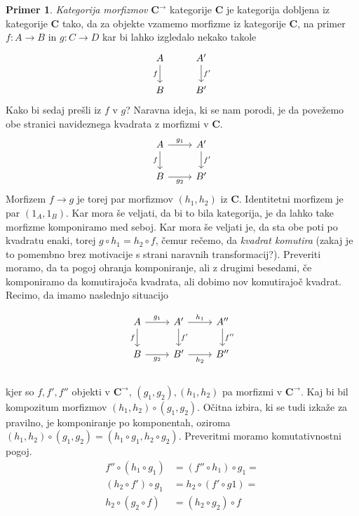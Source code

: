 \documentclass[12pt,a4paper]{book}
\theoremstyle{definition}
\theoremstyle{plain}
\theoremstyle{definition}
\newtheorem{primer}{Primer}[section]
\theoremstyle{remark}
\newcommand{\cat}[1]{\textbf{#1}}
\begin{document}
\begin{primer}
\textit{Kategorija morfizmov} $\cat{C}^{\rightarrow}$ kategorije $\cat{C}$ je kategorija dobljena iz kategorije $\cat{C}$ tako, da za objekte vzamemo morfizme iz kategorije $\cat{C}$, na primer $f : A \to B$ in $g : C \to D$ kar bi lahko izgledalo nekako takole
\[ \begin{tikzcd}
A \arrow[d, "f"'] & A' \arrow[d, "f'"] \\
B & B'
\end{tikzcd} \]
Kako bi sedaj prešli iz $f$ v $g$? Naravna ideja, ki se nam porodi, je da povežemo obe stranici navideznega kvadrata z morfizmi v $\cat{C}$.
\[ \begin{tikzcd}
A \arrow[d, "f"'] \arrow[r, "g_1"] & A' \arrow[d, "f'"] \\
B \arrow[r, "g_2"'] & B'
\end{tikzcd} \]
Morfizem $f \to g$ je torej par morfizmov $(h_1, h_2)$ iz $\cat{C}$.
Identitetni morfizem je par $(1_A, 1_B)$.
Kar mora še veljati, da bi to bila kategorija, je da lahko take morfizme komponiramo med seboj. Kar mora še veljati je, da sta obe poti po kvadratu enaki, torej $g \circ h_1 = h_2 \circ f$, čemur rečemo, da \textit{kvadrat komutira} (zakaj je to pomembno brez motivacije s strani naravnih transformacij?). Preveriti moramo, da ta pogoj ohranja komponiranje, ali z drugimi besedami, če komponiramo da komutirajoča kvadrata, ali dobimo nov komutirajoč kvadrat.
Recimo, da imamo naslednjo situacijo

\[ \begin{tikzcd}
A \arrow[d, "f"'] \arrow[r, "g_1"] & A' \arrow[d, "f'"] \arrow[r, "h_1"] & A'' \arrow[d, "f''"] \\
B \arrow[r, "g_2"'] & B' \arrow[r, "h_2"'] & B'' \\
\end{tikzcd} \]
kjer so $f, f', f''$ objekti v $\cat{C}^{\rightarrow}$, $(g_1, g_2), (h_1,h_2)$ pa morfizmi v $\cat{C}^{\rightarrow}$. Kaj bi bil kompozitum morfizmov $(h_1,h_2) \circ (g_1,g_2)$. Očitna izbira, ki se tudi izkaže za pravilno, je komponiranje po komponentah, oziroma $(h_1,h_2) \circ (g_1,g_2) = (h_1 \circ g_1, h_2 \circ g_2)$. Preveritmi moramo komutativnostni pogoj. 
\begin{align*}
f'' \circ (h_1 \circ g_1) &= (f'' \circ h_1) \circ g_1 = \\
(h_2 \circ f') \circ g_1 &= h_2 \circ (f' \circ g1) = \\
h_2 \circ (g_2 \circ f) &= (h_2 \circ g_2) \circ f
\end{align*}

\end{primer}
\end{document}
